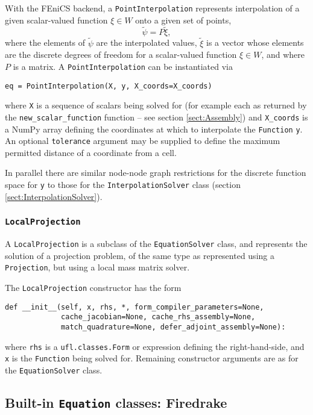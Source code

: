 \documentclass[11pt]{article}
\begin{document}
With the FEniCS backend, a \texttt{PointInterpolation} represents interpolation
of a given scalar-valued function $\xi \in W$ onto a given set of points,
\begin{equation*}
  \tilde{\psi} = P \tilde{\xi},
\end{equation*}
where the elements of $\tilde{\psi}$ are the interpolated values, $\tilde{\xi}$
is a vector whose elements are the discrete degrees of freedom for a
scalar-valued function $\xi \in W$, and where $P$ is a matrix. A
\texttt{PointInterpolation} can be instantiated via
\begin{lstlisting}
eq = PointInterpolation(X, y, X_coords=X_coords)
\end{lstlisting}
where \texttt{X} is a sequence of scalars being solved for (for example each as
returned by the \texttt{new\_scalar\_function} function -- see section
\ref{sect:Assembly}) and \texttt{X\_coords} is a NumPy array defining the
coordinates at which to interpolate the \texttt{Function} \texttt{y}. An
optional \texttt{tolerance} argument may be supplied to define the maximum
permitted distance of a coordinate from a cell.

In parallel there are similar node-node graph restrictions for the discrete
function space for \texttt{y} to those for the \texttt{InterpolationSolver}
class (section \ref{sect:InterpolationSolver}).

\subsubsection{\texttt{LocalProjection}}

A \texttt{LocalProjection} is a subclass of the \texttt{EquationSolver} class,
and represents the solution of a projection problem, of the same type as
represented using a \texttt{Projection}, but using a local mass matrix solver.

The \texttt{LocalProjection} constructor has the form
\begin{lstlisting}
def __init__(self, x, rhs, *, form_compiler_parameters=None,
             cache_jacobian=None, cache_rhs_assembly=None,
             match_quadrature=None, defer_adjoint_assembly=None):
\end{lstlisting}
where \texttt{rhs} is a \texttt{ufl.classes.Form} or expression defining the
right-hand-side, and \texttt{x} is the \texttt{Function} being solved for.
Remaining constructor arguments are as for the \texttt{EquationSolver} class.

\subsection{Built-in \texttt{Equation} classes: Firedrake}
\end{document}
